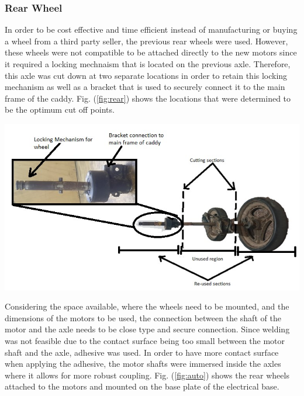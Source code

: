 \documentclass[11pt,landscape]{article}
\newenvironment{Figure}
  {\par\medskip\noindent\minipage{\linewidth}}
  {\endminipage\par\medskip}
\begin{document}
\begin{multicols}{2}
\subsubsection{Rear Wheel}
In order to be cost effective and time efficient instead of manufacturing or
buying a wheel from a third party seller, the previous rear wheels were
used. However, these wheels were not compatible to be attached directly to
the new motors since it required a locking mechnaism that is located on the
previous axle. Therefore, this axle was cut down at two separate locations
in order to retain this locking mechanism as well as a bracket that is used
to securely connect it to the main frame of the caddy. Fig. (\ref{fig:rear})
shows the locations that were determined to be the optimum cut off points.

\begin{Figure}
    \begin{center}
        \includegraphics[width=\textwidth]{Figure26.jpg}
        \label{fig:rear}
    \end{center}
\end{Figure}

Considering the space available, where the wheels need to be mounted, and
the dimensions of the motors to be used, the connection between the shaft of
the motor and the axle needs to be close type and secure connection. Since
welding was not feasible due to the contact surface being too small between
the motor shaft and the axle, adhesive was used. In order to have more
contact surface when applying the adhesive, the motor shafts were immersed
inside the axles where it allows for more robust coupling. Fig.
(\ref{fig:auto}) shows the rear wheels attached to the motors and mounted on
the base plate of the electrical base.


\end{multicols}
\end{document}

